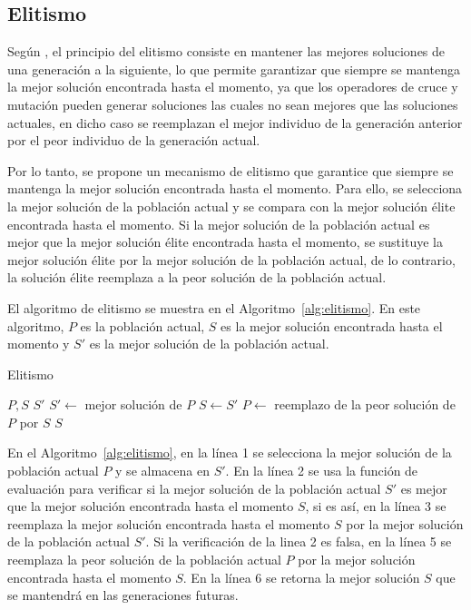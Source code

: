 \documentclass[openany]{article}
\begin{document}
\subsection{Elitismo}

Según \textcite{Hasni2013}, el principio del elitismo consiste en mantener las mejores soluciones de una generación a la siguiente, lo que permite garantizar que siempre se mantenga la mejor solución encontrada hasta el momento, ya que los operadores de cruce y mutación pueden generar soluciones las cuales no sean mejores que las soluciones actuales, en dicho caso se reemplazan el mejor individuo de la generación anterior por el peor individuo de la generación actual.

Por lo tanto, se propone un mecanismo de elitismo que garantice que siempre se mantenga la mejor solución encontrada hasta el momento. Para ello, se selecciona la mejor solución de la población actual y se compara con la mejor solución élite encontrada hasta el momento. Si la mejor solución de la población actual es mejor que la mejor solución élite encontrada hasta el momento, se sustituye la mejor solución élite por la mejor solución de la población actual, de lo contrario, la solución élite reemplaza a la peor solución de la población actual.

El algoritmo de elitismo se muestra en el Algoritmo~\ref{alg:elitismo}. En este algoritmo, $P$ es la población actual, $S$ es la mejor solución encontrada hasta el momento y $S'$ es la mejor solución de la población actual.

\begin{algorithm}[H]
    \caption{Elitismo}\label{alg:elitismo}
    \begin{algorithmic}[1]
        \Require $P, S$
        \Ensure $S'$
        \State $S' \leftarrow$ mejor solución de $P$
        \State $S \leftarrow S'$
        \Else
        \State $P \leftarrow$ reemplazo de la peor solución de $P$ por $S$
        \EndIf
        \State \Return $S$
    \end{algorithmic}

\end{algorithm}

En el Algoritmo~\ref{alg:elitismo}, en la línea 1 se selecciona la mejor solución de la población actual $P$ y se almacena en $S'$. En la línea 2 se usa la función de evaluación para verificar si la mejor solución de la población actual $S'$ es mejor que la mejor solución encontrada hasta el momento $S$, si es así, en la línea 3 se reemplaza la mejor solución encontrada hasta el momento $S$ por la mejor solución de la población actual $S'$. Si la verificación de la linea 2 es falsa, en la línea 5 se reemplaza la peor solución de la población actual $P$ por la mejor solución encontrada hasta el momento $S$. En la línea 6 se retorna la mejor solución  $S$ que se mantendrá en las generaciones futuras.
\end{document}
